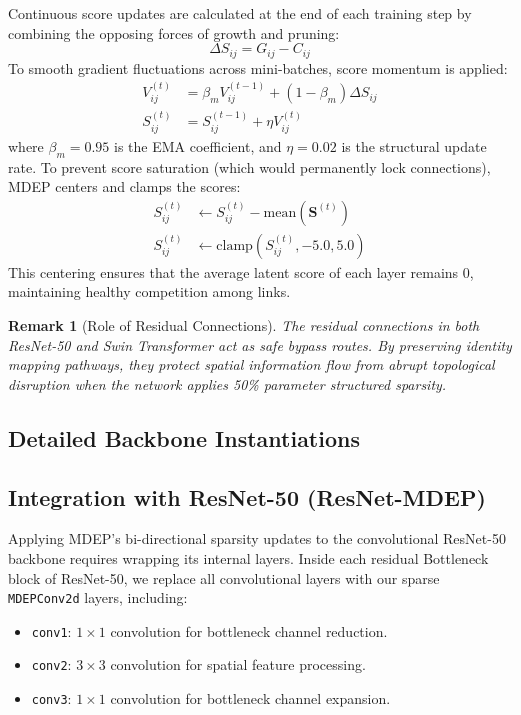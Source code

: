 \documentclass[letterpaper]{article} %
\newtheorem{remark}{Remark}
\begin{document}
Continuous score updates are calculated at the end of each training step by combining the opposing forces of growth and pruning:
\begin{equation}\label{eq:delta_S}
    \Delta S_{ij} = G_{ij} - C_{ij}
\end{equation}
To smooth gradient fluctuations across mini-batches, score momentum is applied:
\begin{align}
    V_{ij}^{(t)} &= \beta_m V_{ij}^{(t-1)} + (1 - \beta_m) \Delta S_{ij} \\
    S_{ij}^{(t)} &= S_{ij}^{(t-1)} + \eta V_{ij}^{(t)}
\end{align}
where $\beta_m = 0.95$ is the EMA coefficient, and $\eta = 0.02$ is the structural update rate. To prevent score saturation (which would permanently lock connections), MDEP centers and clamps the scores:
\begin{align}
    S_{ij}^{(t)} &\leftarrow S_{ij}^{(t)} - \text{mean}(\bm{S}^{(t)}) \\
    S_{ij}^{(t)} &\leftarrow \text{clamp}(S_{ij}^{(t)}, -5.0, 5.0)
\end{align}
This centering ensures that the average latent score of each layer remains 0, maintaining healthy competition among links.

\begin{remark}[Role of Residual Connections]
The residual connections in both ResNet-50 and Swin Transformer act as safe bypass routes. By preserving identity mapping pathways, they protect spatial information flow from abrupt topological disruption when the network applies 50\% parameter structured sparsity.
\end{remark}


\subsection{Detailed Backbone Instantiations}
\subsection{Integration with ResNet-50 (ResNet-MDEP)}\label{subsec:resnet}

Applying MDEP's bi-directional sparsity updates to the convolutional ResNet-50 backbone requires wrapping its internal layers. Inside each residual Bottleneck block of ResNet-50, we replace all convolutional layers with our sparse \texttt{MDEPConv2d} layers, including:
\begin{itemize}
    \item \texttt{conv1}: $1 \times 1$ convolution for bottleneck channel reduction.
    \item \texttt{conv2}: $3 \times 3$ convolution for spatial feature processing.
    \item \texttt{conv3}: $1 \times 1$ convolution for bottleneck channel expansion.
\end{itemize}
\end{document}
